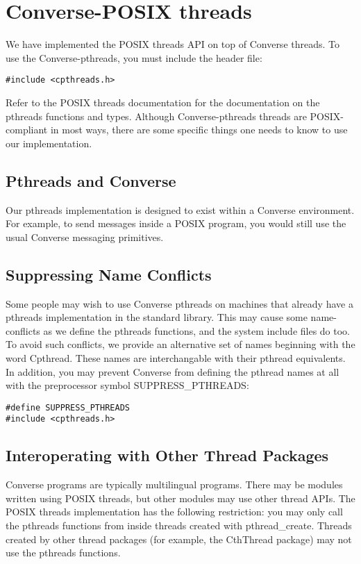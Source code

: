 \chapter{Converse-POSIX threads}

We have implemented the POSIX threads API on top of Converse threads.
To use the Converse-pthreads, you must include the header file:

\verb/#include <cpthreads.h>/

Refer to the POSIX threads documentation for the documentation on the
pthreads functions and types.  Although Converse-pthreads threads are
POSIX-compliant in most ways, there are some specific things one needs
to know to use our implementation.

\section{Pthreads and Converse}

Our pthreads implementation is designed to exist within a Converse
environment.  For example, to send messages inside a POSIX program,
you would still use the usual Converse messaging primitives.

\section{Suppressing Name Conflicts}

Some people may wish to use Converse pthreads on machines that already
have a pthreads implementation in the standard library.  This may
cause some name-conflicts as we define the pthreads functions, and the
system include files do too.  To avoid such conflicts, we provide an
alternative set of names beginning with the word Cpthread.  These
names are interchangable with their pthread equivalents.  In addition,
you may prevent Converse from defining the pthread names at all with
the preprocessor symbol SUPPRESS\_PTHREADS:

\begin{verbatim}
#define SUPPRESS_PTHREADS
#include <cpthreads.h>
\end{verbatim}

\section{Interoperating with Other Thread Packages}

Converse programs are typically multilingual programs.  There may be
modules written using POSIX threads, but other modules may use other
thread APIs.  The POSIX threads implementation has the following
restriction: you may only call the pthreads functions from inside
threads created with pthread\_create.  Threads created by other thread
packages (for example, the CthThread package) may not use the pthreads
functions.

